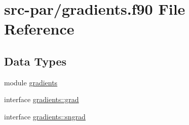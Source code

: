 \hypertarget{gradients_8f90}{\section{src-\/par/gradients.f90 File Reference}
\label{gradients_8f90}
}
\subsection*{Data Types}
\begin{DoxyCompactItemize}
\item 
module \hyperlink{classgradients}{gradients}
\item 
interface \hyperlink{interfacegradients_1_1grad}{gradients\-::grad}
\item 
interface \hyperlink{interfacegradients_1_1sngrad}{gradients\-::sngrad}
\end{DoxyCompactItemize}
